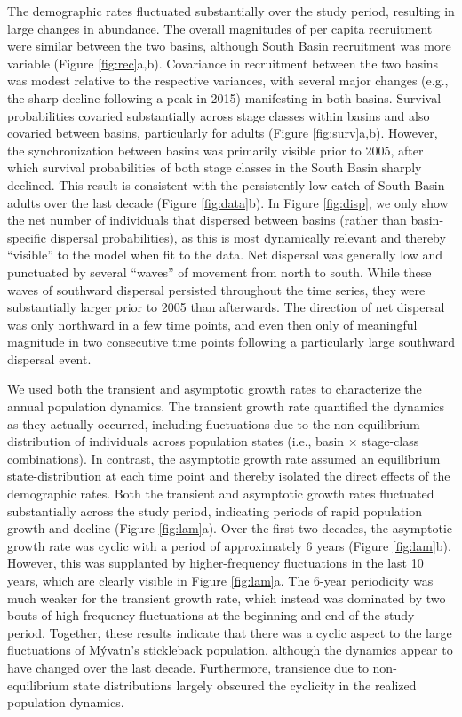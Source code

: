 \documentclass[11pt]{article}
\begin{document}
The demographic rates fluctuated substantially over the study period,
resulting in large changes in abundance. 
The overall magnitudes of per capita recruitment were similar between the two basins,
although South Basin recruitment was more variable (Figure \ref{fig:rec}a,b).
Covariance in recruitment between the two basins was modest relative 
to the respective variances, 
with several major changes (e.g., the sharp decline following a peak in 2015)
manifesting in both basins.
Survival probabilities covaried substantially across stage classes within basins
and also covaried between basins, particularly for adults (Figure \ref{fig:surv}a,b).
However, the synchronization between basins was primarily visible prior to 2005, 
after which survival probabilities of both stage classes 
in the South Basin sharply declined.
This result is consistent with the persistently low catch of South Basin adults 
over the last decade (Figure \ref{fig:data}b).
In Figure \ref{fig:disp}, we only show the net number of individuals
that dispersed between basins (rather than basin-specific dispersal probabilities),
as this is most dynamically relevant and thereby ``visible'' to the model when fit to the data.
Net dispersal was generally low and punctuated by several ``waves'' of movement from 
north to south. 
While these waves of southward dispersal persisted throughout the time series,
they were substantially larger prior to 2005 than afterwards.
The direction of net dispersal was only northward in a few time points, 
and even then only of meaningful magnitude in two consecutive time points 
following a particularly large southward dispersal event.

We used both the transient and asymptotic growth rates 
to characterize the annual population dynamics.
The transient growth rate quantified the dynamics as they actually occurred,
including fluctuations due to the non-equilibrium distribution of individuals across 
population states (i.e., basin $\times$ stage-class combinations).
In contrast, the asymptotic growth rate assumed an equilibrium state-distribution 
at each time point and thereby isolated the direct effects of the demographic rates.
Both the transient and asymptotic growth rates fluctuated substantially 
across the study period, 
indicating periods of rapid population growth and decline (Figure \ref{fig:lam}a).
Over the first two decades, 
the asymptotic growth rate was cyclic with a period of approximately 6 years
(Figure \ref{fig:lam}b).
However, this was supplanted by higher-frequency fluctuations in the last 10 years,
which are clearly visible in Figure \ref{fig:lam}a.
The 6-year periodicity was much weaker for the transient growth rate,
which instead was dominated by two bouts of high-frequency fluctuations
at the beginning and end of the study period.
Together, these results indicate that there was a cyclic aspect to the large fluctuations 
of M\'{y}vatn's stickleback population, 
although the dynamics appear to have changed over the last decade.
Furthermore, transience due to non-equilibrium state distributions
largely obscured the cyclicity in the realized population dynamics.
\end{document}
